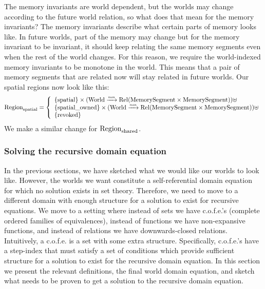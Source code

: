 \begin{jversion}
The memory invariants are world dependent, but the worlds may change according to the future world relation, so what does that mean for the memory invariants?
The memory invariants describe what certain parts of memory looks like.
In future worlds, part of the memory may change but for the memory invariant to be invariant, it should keep relating the same memory segments even when the rest of the world changes.
For this reason, we require the world-indexed memory invariants to be monotone in the world.
This means that a pair of memory segments that are related now will stay related in future worlds.
Our spatial regions now look like this:
\[
  \mathrm{Region}_\mathrm{spatial} = \left\{
  \begin{array}{l}
    \{\mathrm{spatial} \} \times (\mathrm{World} \xrightarrow{\textit{\tiny{mon}}} \mathrm{Rel}(\mathrm{MemorySegment} \times \mathrm{MemorySegment})) \uplus \\
    \{\mathrm{spatial\_owned} \} \times (\mathrm{World} \xrightarrow{\textit{\tiny{mon}}} \mathrm{Rel}(\mathrm{MemorySegment} \times \mathrm{MemorySegment})) \uplus \\
    \{\mathrm{revoked} \}
  \end{array} \right.
\]
We make a similar change for $\mathrm{Region}_\mathrm{shared}$.

\subsubsection{Solving the recursive domain equation}
\label{subsubsec:rec-dom-eq}
%
In the previous sections, we have sketched what we would like our worlds to look like.
However, the worlds we want constitute a self-referential domain equation for which no solution exists in set theory.
Therefore, we need to move to a different domain with enough structure for a solution to exist for recursive equations.
We move to a setting where instead of sets we have c.o.f.e.'s (complete ordered families of equivalences), instead of functions we have non-expansive functions, and instead of relations we have downwards-closed relations.
Intuitively, a c.o.f.e. is a set with some extra structure.
Specifically, c.o.f.e.'s have a step-index that must satisfy a set of conditions which provide sufficient structure for a solution to exist for the recursive domain equation.
In this section we present the relevant definitions, the final world domain equation, and sketch what needs to be proven to get a solution to the recursive domain equation.


\end{jversion}
